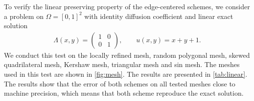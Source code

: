 \documentclass[times,review,preprint,authoryear]{elsarticle}
\begin{document}
To verify the linear preserving property of the edge-centered schemes, we consider a problem on $\Omega = [0,1]^2$ with identity diffusion coefficient and linear exact solution
\begin{align*}
\Lambda(x,y) =
\left(
\begin{matrix}
1 & 0 \\
0 & 1
\end{matrix}
\right),
\qquad
u(x,y) = x + y + 1.
\end{align*}
We conduct this test on the locally refined mesh, random polygonal mesh, skewed quadrilateral mesh, Kershaw mesh, triangular mesh and sin mesh. The meshes used in this test are shown in \cref{fig:mesh}. The results are presented in \cref{tab:linear}. The results show that the error of both schemes on all tested meshes close to machine precision, which means that both scheme reproduce the exact solution.
\end{document}
